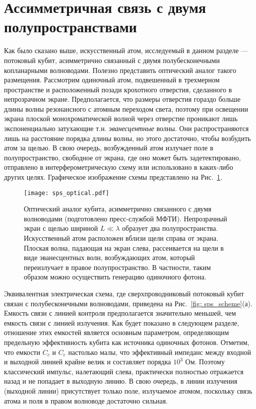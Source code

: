 \section{Ассимметричная связь с двумя полупространствами}
Как было сказано выше, искусственный атом, исследуемый в данном разделе --- потоковый кубит, асимметрично связанный с двумя полубесконечными копланарными волноводами. Полезно представить оптический аналог такого размещения. Рассмотрим одиночный атом, подвешенный в трехмерном пространстве и расположенный позади крохотного отверстия, сделанного в непрозрачном экране. Предполагается, что размеры отверстия гораздо больше длины волны резонансного с атомным переходом света, поэтому при освещении экрана плоской монохроматической волной через отверстие проникают лишь экспоненциально затухающие т.н. \textit{эванесцентные} волны. Они распространяются лишь на расстояние порядка длины волны, но этого достаточно, чтобы возбудить атом за щелью. В свою очередь, возбужденный атом излучает поле в полупространство, свободное от экрана, где оно может быть задетектировано, отправлено в интерферометрическую схему или использовано в каких-либо других целях. Графическое изображение схемы представлено на Рис.~\ref{fig: hole}. 
\begin{figure}
	\centering
	\texttt{[image: sps\_optical.pdf]}
	\caption[Оптический аналог кубита, связанного с двумя полупространствами асимметричным образом]{Оптический аналог кубита, асимметрично связанного с двумя волноводами (подготовлено пресс-службой МФТИ). Непрозрачный экран с щелью шириной $L \ll \lambda$ образует два полупространства. Искусственный атом расположен вблизи щели справа от экрана. Плоская волна, падающая на экран слева, рассеивается на щели в виде эванесцентных волн, возбуждающих атом, который переизлучает в правое полупространство. В частности, таким образом можно осуществить генерацию одиночного фотона.}
	\label{fig: hole}
\end{figure}
Эквивалентная электрическая схема, где сверхпроводниковый потоковый кубит связан с полубесконечными волноводами, приведена на Рис.~\ref{fig: sps_scheme}(а). Емкость связи с линией контроля предполагается значительно меньшей, чем емкость связи с линией излучения. Как будет показано в следующем разделе, отношение этих емкостей является основным параметром, определяющим предельную эффективность кубита как источника одиночных фотонов. Отметим, что емкости $C_c$ и $C_e$ настолько малы, что эффективный импеданс между входной и выходной линией крайне велик и составляет порядка $10^3$ Ом. Поэтому классический импульс, налетающий слева, практически полностью отражается назад и не попадает в выходную линию. В свою очередь, в линии излучения (выходной линии) присутствует только поле, излучаемое атомом, поскольку связь атома и поля в правом волноводе достаточно сильная. 
